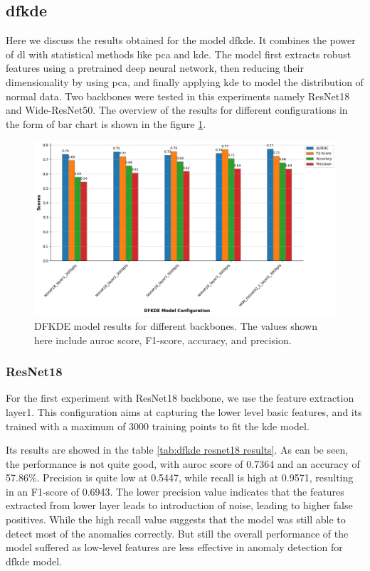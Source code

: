 \subsection*{\gls{dfkde}}

Here we discuss the results obtained for the model \gls{dfkde}. It combines the power of \gls{dl} with statistical methods like \gls{pca} and \gls{kde}. The model first extracts robust features using a pretrained deep neural network, then reducing their dimensionality by using \gls{pca}, and finally applying \gls{kde} to model the distribution of normal data. Two backbones were tested in this experiments namely ResNet18 and Wide-ResNet50. The overview of the results for different configurations in the form of bar chart is shown in the figure \ref{fig:dfkde model results}.

\begin{figure}[ht!]
    \centering
    \includegraphics[width=1.2\linewidth]{Rohit_Master_Thesis//Images/dfkde_model_results.png}
    \caption{DFKDE model results for different backbones. The values shown here include \gls{auroc} score, F1-score, accuracy, and precision.}
    \label{fig:dfkde model results}
\end{figure}

\subsubsection*{ResNet18}

For the first experiment with ResNet18 backbone, we use the feature extraction layer1. This configuration aims at capturing the lower level basic features, and its trained with a maximum of 3000 training points to fit the \gls{kde} model.

Its results are showed in the table \ref{tab:dfkde resnet18 results}. As can be seen, the performance is not quite good, with \gls{auroc} score of 0.7364 and an accuracy of 57.86\%. Precision is quite low at 0.5447, while recall is high at 0.9571, resulting in an F1-score of 0.6943. The lower precision value indicates that the features extracted from lower layer leads to introduction of noise, leading to higher false positives. While the high recall value suggests that the model was still able to detect most of the anomalies correctly. But still the overall performance of the model suffered as low-level features are less effective in anomaly detection for \gls{dfkde} model.

